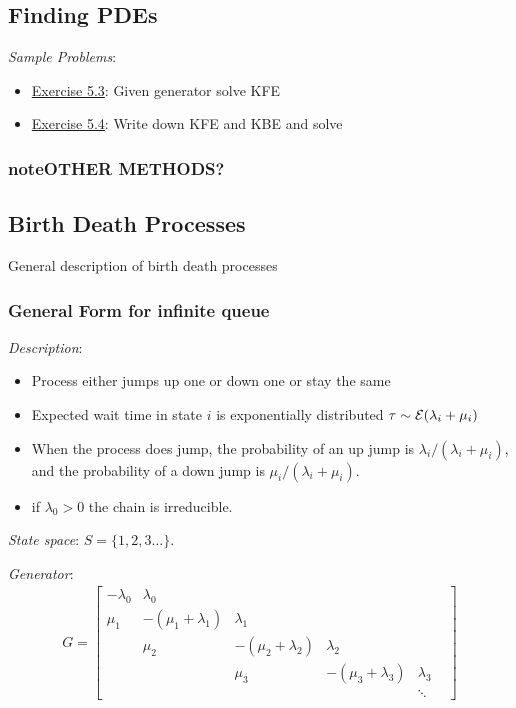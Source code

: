 \documentclass[12pt]{article}
\begin{document}
\subsection{Finding PDEs}



\textit{Sample Problems}: 
\begin{itemize}[nolistsep]
    \item \hyperref[Exercise 5.3]{Exercise 5.3}: Given generator solve KFE
    \item \hyperref[Exercise 5.4]{Exercise 5.4}: Write down KFE and KBE and solve
\end{itemize}


\subsubsection{note{OTHER METHODS?}}

\subsection{Birth Death Processes}

General description of birth death processes

\subsubsection{General Form for infinite queue}
\textit{Description}:
\begin{itemize}[nolistsep]
    \item Process either jumps up one or down one or stay the same
    \item Expected wait time in state \( i \) is exponentially distributed \( \tau \sim \mathcal{E}( \lambda_i + \mu_i) \)
    \item When the process does jump, the probability of an up jump is \( \lambda_i / (\lambda_i+\mu_i) \), and the probability of a down jump is \( \mu_i / (\lambda_i+\mu_i) \).
    \item if \( \lambda_0 > 0 \) the chain is irreducible.
\end{itemize}


\textit{State space}: \( S = \{1,2,3\ldots\}  \).

\textit{Generator}:
\begin{align*}
    G = \left[\begin{array}{cccccc}
        -\lambda_0 & \lambda_0 \\
        \mu_1 & -(\mu_1+\lambda_1) & \lambda_1 \\
        & \mu_2 & -(\mu_2+\lambda_2) & \lambda_2 \\
        && \mu_3 & -(\mu_3+\lambda_3) & \lambda_3 \\
        &&&  & \ddots &  
    \end{array}\right]
\end{align*}
\end{document}
